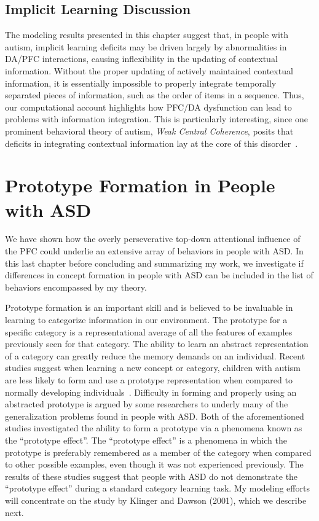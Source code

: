 \documentclass[man]{apa}
\begin{document}
\subsection{Implicit Learning Discussion}

The modeling results presented in this chapter suggest that, in people with autism, implicit learning deficits may be driven largely by abnormalities in DA/PFC interactions, causing inflexibility in the updating of contextual information.  Without the proper updating of actively maintained contextual information, it is essentially impossible to properly integrate temporally separated pieces of information, such as the order of items in a sequence.  Thus, our computational account highlights how PFC/DA dysfunction can lead to problems with information integration.  This is particularly interesting, since one prominent behavioral theory of autism, \emph{Weak Central Coherence}, posits that deficits in integrating contextual information lay at the core of this disorder~\cite{HappeF:1999:WCC}.  

\section{Prototype Formation in People with ASD}
We have shown how the overly perseverative top-down attentional influence of the PFC could underlie an extensive array of behaviors in people with ASD.  In this last chapter before concluding and summarizing my work, we investigate if differences in concept formation in people with ASD can be included in the list of behaviors encompassed by my theory.  

Prototype formation is an important skill and is believed to be invaluable in learning to categorize information in our environment.  The prototype for a specific category is a representational average of all the features of examples previously seen for that category.  The ability to learn an abstract representation of a category can greatly reduce the memory demands on an individual. Recent studies suggest when learning a new concept or category, children with autism are less likely to form and use a prototype representation when compared to normally developing individuals~\cite{RefWorks:113,StraussMS:2009:Prototype}.  Difficulty in forming and properly using an abstracted prototype is argued by some researchers to underly many of the generalization problems found in people with ASD.   Both of the aforementioned studies investigated the ability to form a prototype via a phenomena known as the ``prototype effect''.  The ``prototype effect'' is a phenomena in which the prototype is preferably remembered as a member of the category when compared to other possible examples, even though it was not experienced previously.  The results of these studies suggest that people with ASD do not demonstrate the ``prototype effect'' during a standard category learning task.  My modeling efforts will concentrate on the study by Klinger and Dawson (2001), which we describe next. 
\end{document}
